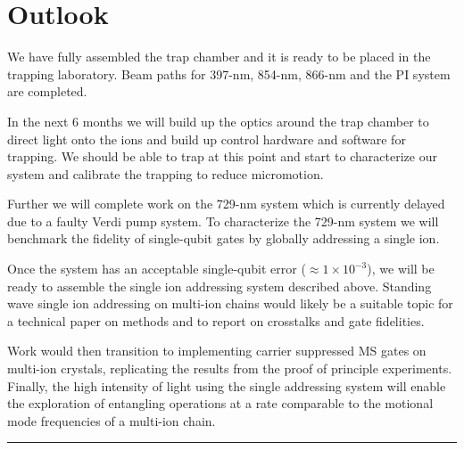 \documentclass[12pt]{iopart}
\begin{document}

\section{Outlook}
We have fully assembled the trap chamber and it is ready to be placed
in the trapping laboratory.  Beam paths for 397-nm, 854-nm, 866-nm and
the PI system are completed.

In the next 6 months we will build up the optics around the trap
chamber to direct light onto the ions and build up control hardware
and software for trapping. We should be able to trap at this point and
start to characterize our system and calibrate the trapping to reduce
micromotion.

Further we will complete work on the 729-nm system which is currently
delayed due to a faulty Verdi pump system. To characterize the 729-nm
system we will benchmark the fidelity of single-qubit gates by
globally addressing a single ion.

Once the system has an acceptable single-qubit error
($\approx 1\times10^{-3}$), we will be ready to assemble the single ion
addressing system described above. Standing wave single ion addressing
on multi-ion chains would likely be a suitable topic for a technical
paper on methods and to report on crosstalks and gate fidelities.

Work would then transition to implementing carrier suppressed MS gates
on multi-ion crystals, replicating the results from the proof of
principle experiments. Finally, the high intensity of light using the
single addressing system will enable the exploration of entangling
operations at a rate comparable to the motional mode frequencies of a
multi-ion chain.

\vspace{2em}
\hrule
\clearpage

\printbibliography

\clearpage
\end{document}

